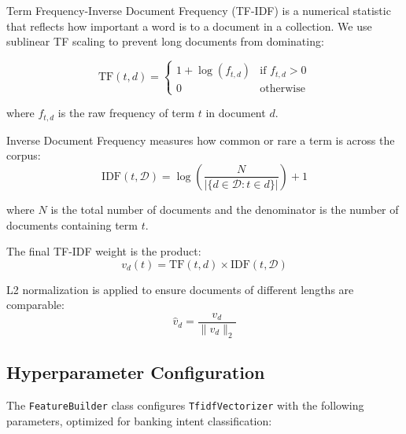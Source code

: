 \documentclass[12pt,a4paper]{article}
\begin{document}
Term Frequency-Inverse Document Frequency (TF-IDF) is a numerical statistic that reflects how important a word is to a document in a collection. We use sublinear TF scaling to prevent long documents from dominating:

\begin{equation}
    \text{TF}(t,d) = \begin{cases}
        1 + \log(f_{t,d}) & \text{if } f_{t,d} > 0 \\
        0 & \text{otherwise}
    \end{cases}
\end{equation}

where $f_{t,d}$ is the raw frequency of term $t$ in document $d$.

Inverse Document Frequency measures how common or rare a term is across the corpus:
\begin{equation}
    \text{IDF}(t,\mathcal{D}) = \log\left(\frac{N}{|\{d \in \mathcal{D}: t \in d\}|}\right) + 1
\end{equation}

where $N$ is the total number of documents and the denominator is the number of documents containing term $t$.

The final TF-IDF weight is the product:
\begin{equation}
    v_d(t) = \text{TF}(t,d) \times \text{IDF}(t,\mathcal{D})
\end{equation}

L2 normalization is applied to ensure documents of different lengths are comparable:
\begin{equation}
    \hat{v}_d = \frac{v_d}{\|v_d\|_2}
\end{equation}

\subsection{Hyperparameter Configuration}
\label{subsec:tfidf-config}

The \texttt{FeatureBuilder} class configures \texttt{TfidfVectorizer} with the following parameters, optimized for banking intent classification:
\end{document}
